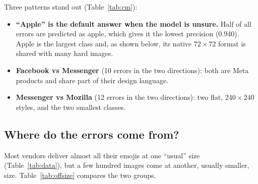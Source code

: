 \documentclass[11pt,a4paper]{article}
\newcommand{\vendor}[1]{\textsf{#1}}
\begin{document}
\noindent Three patterns stand out (Table~\ref{tab:cm}):
\begin{itemize}
  \item \textbf{``Apple'' is the default answer when the model is unsure.} Half of all errors are
  predicted as \vendor{apple}, which gives it the lowest precision (0.940). Apple is the largest class
  and, as shown below, its native $72\times72$ format is shared with many hard images.
  \item \textbf{Facebook vs Messenger} (10 errors in the two directions): both are Meta products and share
  part of their design language.
  \item \textbf{Messenger vs Mozilla} (12 errors in the two directions): two flat, $240\times240$ styles, and the two smallest
  classes.
\end{itemize}

\subsection{Where do the errors come from?}

Most vendors deliver almost all their emojis at one ``usual'' size (Table~\ref{tab:data}), but a few
hundred images come at another, usually smaller, size. Table~\ref{tab:offsize} compares the two groups.
\end{document}
